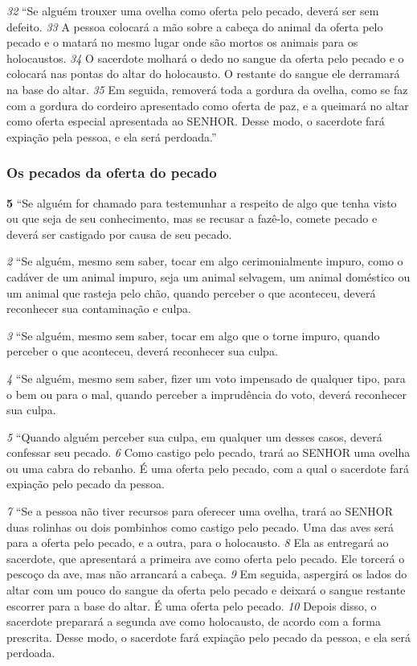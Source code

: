\smallskip
\textit{\tiny 32}
“Se alguém trouxer uma ovelha como oferta pelo pecado, deverá ser sem
defeito. 
\textit{\tiny 33}
A pessoa colocará a mão sobre a cabeça do animal da oferta pelo
pecado e o matará no mesmo lugar onde são mortos os animais para os
holocaustos. 
\textit{\tiny 34}
O sacerdote molhará o dedo no sangue da oferta pelo pecado e o
colocará nas pontas do altar do holocausto. O restante do sangue ele derramará
na base do altar. 
\textit{\tiny 35}
Em seguida, removerá toda a gordura da ovelha, como se faz
com a gordura do cordeiro apresentado como oferta de paz, e a queimará no altar
como oferta especial apresentada ao SENHOR. Desse modo, o sacerdote fará
expiação pela pessoa, e ela será perdoada.”

\bigskip
\subsubsection*{Os pecados da oferta do pecado}
\textbf{\large 5} “Se alguém for chamado para testemunhar a respeito de algo que tenha visto
ou que seja de seu conhecimento, mas se recusar a fazê-lo, comete pecado e
deverá ser castigado por causa de seu pecado. 

\smallskip
\textit{\tiny 2} 
“Se alguém, mesmo sem saber, tocar em algo cerimonialmente impuro, como
o cadáver de um animal impuro, seja um animal selvagem, um animal doméstico
ou um animal que rasteja pelo chão, quando perceber o que aconteceu, deverá
reconhecer sua contaminação e culpa. 

\smallskip
\textit{\tiny 3} 
“Se alguém, mesmo sem saber, tocar em algo que o torne impuro, quando
perceber o que aconteceu, deverá reconhecer sua culpa. 

\smallskip
\textit{\tiny 4} 
“Se alguém, mesmo sem saber, fizer um voto impensado de qualquer tipo,
para o bem ou para o mal, quando perceber a imprudência do voto, deverá
reconhecer sua culpa. 

\smallskip
\textit{\tiny 5} 
“Quando alguém perceber sua culpa, em qualquer um desses casos, deverá
confessar seu pecado. 
\textit{\tiny 6} 
Como castigo pelo pecado, trará ao SENHOR uma ovelha ou
uma cabra do rebanho. É uma oferta pelo pecado, com a qual o sacerdote fará
expiação pelo pecado da pessoa. 

\smallskip
\textit{\tiny 7} 
“Se a pessoa não tiver recursos para oferecer uma ovelha, trará ao SENHOR duas
rolinhas ou dois pombinhos como castigo pelo pecado. Uma das aves será para a
oferta pelo pecado, e a outra, para o holocausto. 
\textit{\tiny 8} 
Ela as entregará ao sacerdote,
que apresentará a primeira ave como oferta pelo pecado. Ele torcerá o pescoço da
ave, mas não arrancará a cabeça. 
\textit{\tiny 9} 
Em seguida, aspergirá os lados do altar com um
pouco do sangue da oferta pelo pecado e deixará o sangue restante escorrer para
a base do altar. É uma oferta pelo pecado. 
\textit{\tiny 10}
Depois disso, o sacerdote preparará a
segunda ave como holocausto, de acordo com a forma prescrita. Desse modo, o
sacerdote fará expiação pelo pecado da pessoa, e ela será perdoada.
   
